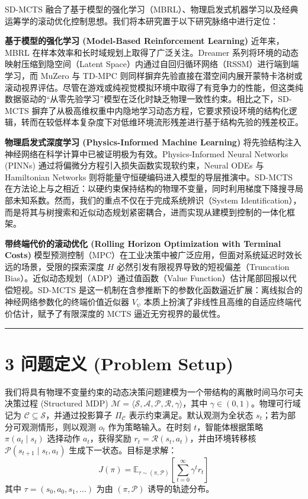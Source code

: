 \documentclass[UTF8]{ctexart}
\begin{document}
SD-MCTS
融合了基于模型的强化学习（MBRL）、物理启发式机器学习以及经典运筹学的滚动优化控制思想。我们将本研究置于以下研究脉络中进行定位：

\textbf{基于模型的强化学习 (Model-Based Reinforcement Learning)}
近年来，MBRL 在样本效率和长时域规划上取得了广泛关注。Dreamer
系列将环境的动态映射压缩到隐空间（Latent
Space）内通过自回归循环网络（RSSM）进行端到端学习，而 MuZero 与 TD-MPC
则同样摒弃先验直接在潜空间内展开蒙特卡洛树或滚动视界评估。尽管在游戏或纯视觉模拟环境中取得了有竞争力的性能，但这类纯数据驱动的“从零先验学习”模型在泛化时缺乏物理一致性约束。相比之下，SD-MCTS
摒弃了从极高维权重中内隐地学习动态方程，它要求预设环境的结构化逻辑，转而在较低样本复杂度下对低维环境流形残差进行基于结构先验的残差校正。

\textbf{物理启发式深度学习 (Physics-Informed Machine Learning)}
将先验结构注入神经网络在科学计算中已被证明极为有效。Physics-Informed
Neural Networks (PINNs) 通过将偏微分方程引入损失函数实现软约束，Neural
ODEs 与 Hamiltonian Networks
则将能量守恒硬编码进入模型的导层推演中。SD-MCTS
在方法论上与之相近：以硬约束保持结构的物理不变量，同时利用梯度下降搜寻局部未知系数。然而，我们的重点不仅在于完成系统辨识（System
Identification），而是将其与树搜索和近似动态规划紧密耦合，进而实现从建模到控制的一体化框架。

\textbf{带终端代价的滚动优化 (Rolling Horizon Optimization with Terminal
Costs)}
模型预测控制（MPC）在工业决策中被广泛应用，但面对系统延迟时效长远的场景，受限的探索深度
\(H\) 必然引发有限视界导致的短视偏差（Truncation
Bias）。近似动态规划（ADP）通过值函数（Value
Function）估计尾部回报以代偿短视。SD-MCTS
是这一机制在含参推断下的参数化函数逼近扩展：离线拟合的神经网络参数化的终端价值近似器 \(V_{\psi}\) 本质上扮演了非线性且高维的自适应终端代价估计，赋予了有限深度的
MCTS 逼近无穷视界的最优性。

\begin{center}\rule{0.5\linewidth}{0.4pt}\end{center}

\hypertarget{sec-problem-setup}{%
\section{3 问题定义 (Problem
Setup)}\label{sec-problem-setup}}

我们将具有物理不变量约束的动态决策问题建模为一个带结构的离散时间马尔可夫决策过程
(Structured MDP)
\(\mathcal{M}=\langle \mathcal{S},\mathcal{A},\mathcal{P},\mathcal{R},\gamma\rangle\)，其中
\(\gamma\in(0,1)\)。物理可行域记为 \(\mathcal{C}\subseteq\mathcal{S}\)，并通过投影算子 \(\Pi_{\mathcal{C}}\) 表示约束满足。默认观测为全状态 \(s_t\)；若为部分可观测情形，则以观测 \(o_t\) 作为策略输入。在时刻 \(t\)，智能体根据策略 \(\pi(a_t\mid s_t)\)
选择动作 \(a_t\)，获得奖励 \(r_t=\mathcal{R}(s_t,a_t)\)，并由环境转移核
\(\mathcal{P}(s_{t+1}\mid s_t,a_t)\) 生成下一状态。目标是求解： \[
J(\pi)=\mathbb{E}_{\tau\sim(\pi,\mathcal{P})}\!\left[\sum_{t=0}^{\infty}\gamma^t r_t\right]
\] 其中 \(\tau=(s_0,a_0,s_1,\ldots)\) 为由 \((\pi,\mathcal{P})\)
诱导的轨迹分布。
\end{document}
